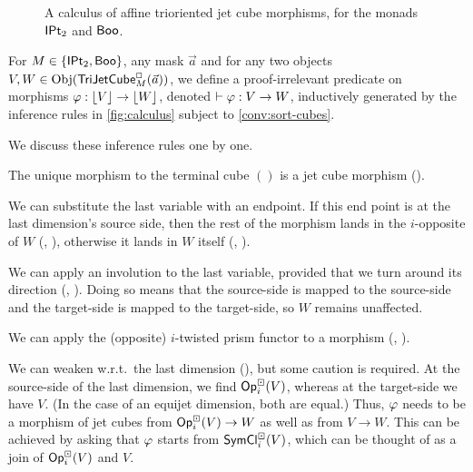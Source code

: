 \documentclass[a4paper]{article}
\begin{document}
\begin{figure}
	\caption{A calculus of affine trioriented jet cube morphisms, for the monads ${\mathsf{IPt}_2}$ and $\mathsf{Boo}$.}
\end{figure}
\begin{definition} \label{def:calculus}
	For $M \in \mathopen{}\left\{ {\mathsf{IPt}_2}, \mathsf{Boo} \right\}\mathclose{}$, any mask $\vec a$ and for any two objects $V, W \in \mathrm{Obj}(\mathsf{TriJetCube}^{\Box}_{M}\mathopen{}\left( \vec a \right)\mathclose{})$, we define a proof-irrelevant predicate on morphisms $\varphi : \mathopen{}\left\lfloor V \right\rfloor\mathclose{} \to \mathopen{}\left\lfloor W \right\rfloor\mathclose{}$, denoted $\vdash \varphi : V \to W$, inductively generated by the inference rules in \cref{fig:calculus} subject to \cref{conv:sort-cubes}.
\end{definition}
We discuss these inference rules one by one.

The unique morphism to the terminal cube $()$ is a jet cube morphism ().

We can substitute the last variable with an endpoint. If this end point is at the last dimension's source side, then the rest of the morphism lands in the $i$-opposite of $W$ (, ), otherwise it lands in $W$ itself (, ).

We can apply an involution to the last variable, provided that we turn around its direction (, ). Doing so means that the source-side is mapped to the source-side and the target-side is mapped to the target-side, so $W$ remains unaffected.

We can apply the (opposite) $i$-twisted prism functor to a morphism (, ).

We can weaken w.r.t.\ the last dimension (), but some caution is required. At the source-side of the last dimension, we find ${\mathsf{Op}}^\boxdot_i(V)$, whereas at the target-side we have $V$. (In the case of an equijet dimension, both are equal.)
Thus, $\varphi$ needs to be a morphism of jet cubes from ${\mathsf{Op}}^\boxdot_i(V) \to W$ as well as from $V \to W$.
This can be achieved by asking that $\varphi$ starts from $\mathsf{SymCl}^\boxdot_i(V)$, which can be thought of as a join of ${\mathsf{Op}}^\boxdot_i(V)$ and $V$.
\end{document}
